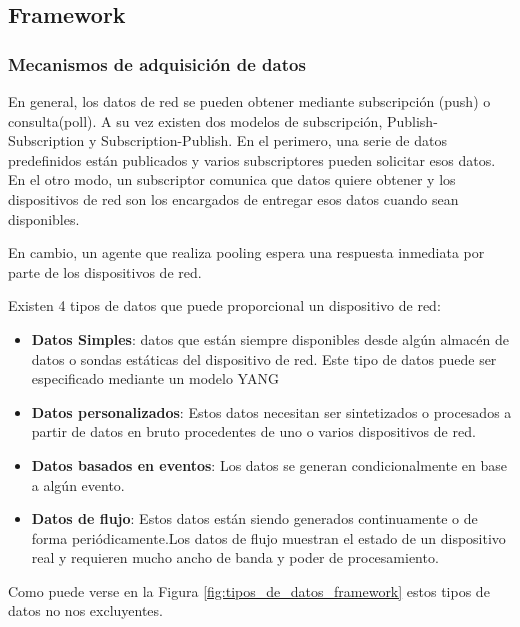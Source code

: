 \subsection{Framework}

\subsubsection{Mecanismos de adquisición de datos}

En general, los datos de red se pueden obtener mediante subscripción (push) o consulta(poll). A su vez existen dos modelos de subscripción, Publish-Subscription y Subscription-Publish. En el perimero, una serie de datos predefinidos están publicados y varios subscriptores pueden solicitar esos datos. En el otro modo, un subscriptor comunica que datos quiere obtener y los dispositivos de red son los encargados de entregar esos datos cuando sean disponibles.

En cambio, un agente que realiza pooling espera una respuesta inmediata por parte de los dispositivos de red. 

Existen 4 tipos de datos que puede proporcional un dispositivo de red:
\begin{itemize}
    \item \textbf{Datos Simples}: datos que están siempre disponibles desde algún almacén de datos o sondas estáticas del dispositivo de red. Este tipo de datos puede ser especificado mediante un modelo YANG
    \item \textbf{Datos personalizados}: Estos datos necesitan ser sintetizados o procesados a partir de datos en bruto procedentes de uno o varios dispositivos de red.
    \item \textbf{Datos basados en eventos}: Los datos se generan condicionalmente en base a algún evento.
    \item \textbf{Datos de flujo}: Estos datos están siendo generados continuamente o de forma periódicamente.Los datos de flujo muestran el estado de un dispositivo real y requieren mucho ancho de banda y poder de procesamiento.
\end{itemize}

Como puede verse en la Figura \ref{fig:tipos_de_datos_framework} estos tipos de datos no nos excluyentes.

